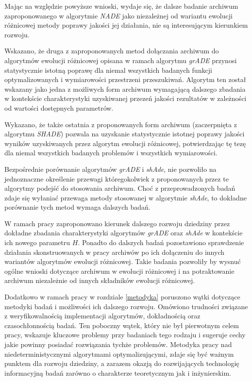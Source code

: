 \documentclass[12pt,a4paper]{report}
\begin{document}
{{{{{{{{}
\par{
Mając na względzie powyższe wnioski, wydaje się, że dalsze badanie archiwum zaproponowanego w algorytmie \emph{NADE} jako niezależnej od wariantu ewolucji różnicowej metody poprawy jakości jej działania, nie są interesującym kierunkiem rozwoju.
}
\par{
Wskazano, że druga z zaproponowanych metod dołączania archiwum do algorytmów ewolucji różnicowej opisana w ramach algorytmu \emph{grADE} przynosi statystycznie istotną poprawę dla niemal wszystkich badanych funkcji optymalizowanych i wymiarowości przestrzeni przeszukiwań. Algorytm ten został wskazany jako jedna z możliwych form archiwum wymagającą dalszego zbadania w kontekście charakterystyki uzyskiwanej przezeń jakości rezultatów w zależności od wartości dostępnych parametrów.
}
\par{
Wykazano, że także ostatnia z proponowanych form archiwum (zaczerpnięta z algorytmu \emph{SHADE}) pozwala na uzyskanie statystycznie istotnej poprawy jakości wyników uzyskiwanych przez algorytm ewolucji różnicowej, potwierdzając tę tezę dla niemal wszystkich badanych problemów i wszystkich wymiarowości.
}
\par{
Bezpośrednie porównanie algorytmów \emph{grADE} i \emph{shAde}, nie pozwoliło na jednoznaczne określenie przewagi któregokolwiek z proponowanych przez te algorytmy podejść do stosowania archiwum. Choć z przeprowadzonych badań zdaje się wyłaniać przewaga metody stosowanej w algorytmie \emph{shAde}, to dokładne porównanie tych metod wymaga dalszych badań.
}
\par{
W ramach pracy zaproponowano kierunek dalszego rozwoju dziedziny przez dokładne zbadania charakterystyki algorytmów \emph{grADE} oraz \emph{shAde} w kontekście ich nowego parametru $H$. Ponadto do dalszych badań pozostawiono sprawdzenie działania skonstruowanych w pracy archiwów po ich dołączeniu do innych wariantów algorytmów ewolucji różnicowej. Takie badania pozwoliły by wysnuć ogólne wnioski dotyczące archiwum w ewolucji różnicowej i na potraktowanie archiwum niezależnie od innych składników ewolucji różnicowej.
}
\par{
Dodatkowo w ramach pracy w rozdziale \ref{metodyka} poruszono wątki dotyczące metodyki badań i możliwości ich dalszego rozwoju. Omówiono trudności związane z weryfikowalnością implementacji algorytmów, dokładnością oraz czasochłonnością badań. Ten poboczny wątek, który nie był pierwotnym celem pracy, wskazuje kluczowe problemy przy badaniach tego rodzaju i sugeruje cechy jakie powinny posiadać rozwiązania tychże problemów. Metodyka pracy nad niedeterministycznymi algorytmami optymalizującymi, zdaje się być ważnym punktem dla rozwoju dziedziny, a zarazem okazją do rozwijających technologię informacyjną badań zarówno o charakterze teoretycznym jak i inżynierskim.
}
\appendix
\begin{samepage}

\end{samepage}}}}}}}}
\end{document}
